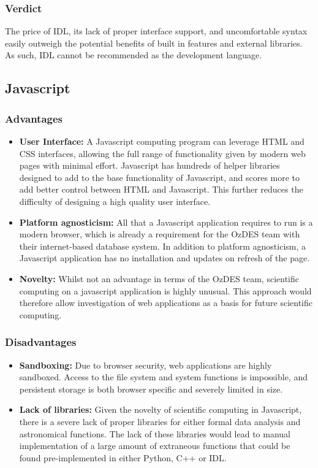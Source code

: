 \documentclass[titlesmallcaps, examinerscopy, copyrightpage]{uqthesis}
\begin{document}
\subsubsection{Verdict}

The price of IDL, its lack of proper interface support, and uncomfortable syntax easily outweigh the potential benefits of built in features and external libraries. As such, IDL cannot be recommended as the development language.

\subsection{Javascript}
\subsubsection{Advantages}
\begin{itemize}
\item \textbf{User Interface:} A Javascript computing program can leverage HTML and CSS interfaces, allowing the full range of functionality given by modern web pages with minimal effort. Javascript has hundreds of helper libraries designed to add to the base functionality of Javascript, and scores more to add better control between HTML and Javascript. This further reduces the difficulty of designing a high quality user interface.
\item \textbf{Platform agnosticism:} All that a Javascript application requires to run is a modern browser, which is already a requirement for the OzDES team with their internet-based database system. In addition to platform agnosticism, a Javascript application has no installation and updates on refresh of the page.
\item \textbf{Novelty:} Whilst not an advantage in terms of the OzDES team, scientific computing on a javascript application is highly unusual. This approach would therefore allow investigation of web applications as a basis for future scientific computing.
\end{itemize}
\subsubsection{Disadvantages}
\begin{itemize}
\item \textbf{Sandboxing:} Due to browser security, web applications are highly sandboxed. Access to the file system and system functions is impossible, and persistent storage is both browser specific and severely limited in size. 
\item \textbf{Lack of libraries:} Given the novelty of scientific computing in Javascript, there is a severe lack of proper libraries for either formal data analysis and astronomical functions. The lack of these libraries would lead to manual implementation of a large amount of extraneous functions that could be found pre-implemented in either Python, C++ or IDL.
\end{itemize}
\end{document}
